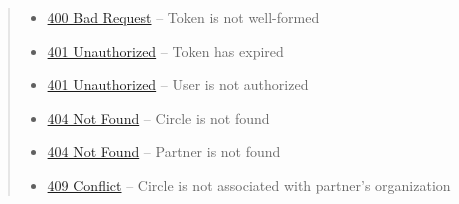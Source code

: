\documentclass[letterpaper,10pt,english]{sphinxmanual}
\begin{document}
\begin{fulllineitems}
\begin{quote}
\begin{description}
\begin{itemize}
\item {} 
\href{http://www.w3.org/Protocols/rfc2616/rfc2616-sec10.html\#sec10.4.1}{400 Bad Request} -- Token is not well-formed

\item {} 
\href{http://www.w3.org/Protocols/rfc2616/rfc2616-sec10.html\#sec10.4.2}{401 Unauthorized} -- Token has expired

\item {} 
\href{http://www.w3.org/Protocols/rfc2616/rfc2616-sec10.html\#sec10.4.2}{401 Unauthorized} -- User is not authorized

\item {} 
\href{http://www.w3.org/Protocols/rfc2616/rfc2616-sec10.html\#sec10.4.5}{404 Not Found} -- Circle is not found

\item {} 
\href{http://www.w3.org/Protocols/rfc2616/rfc2616-sec10.html\#sec10.4.5}{404 Not Found} -- Partner is not found

\item {} 
\href{http://www.w3.org/Protocols/rfc2616/rfc2616-sec10.html\#sec10.4.10}{409 Conflict} -- Circle is not associated with partner's organization

\end{itemize}

\end{description}\end{quote}

\end{fulllineitems}
\end{document}
